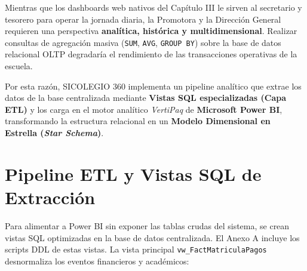 \documentclass[12pt,a4paper,oneside]{report}
\begin{document}
    Mientras que los dashboards web nativos del Capítulo III le sirven al secretario y tesorero para operar la jornada diaria, la Promotora y la Dirección General requieren una perspectiva \textbf{analítica, histórica y multidimensional}. Realizar consultas de agregación masiva (\texttt{SUM}, \texttt{AVG}, \texttt{GROUP BY}) sobre la base de datos relacional OLTP degradaría el rendimiento de las transacciones operativas de la escuela.

    Por esta razón, SICOLEGIO 360 implementa un pipeline analítico que extrae los datos de la base centralizada mediante \textbf{Vistas SQL especializadas (Capa ETL)} y los carga en el motor analítico \textit{VertiPaq} de \textbf{Microsoft Power BI}, transformando la estructura relacional en un \textbf{Modelo Dimensional en Estrella (\textit{Star Schema})}.

    \section{Pipeline ETL y Vistas SQL de Extracción}

    Para alimentar a Power BI sin exponer las tablas crudas del sistema, se crean vistas SQL optimizadas en la base de datos centralizada. El Anexo A incluye los scripts DDL de estas vistas. La vista principal \texttt{vw\_FactMatriculaPagos} desnormaliza los eventos financieros y académicos:
\end{document}
